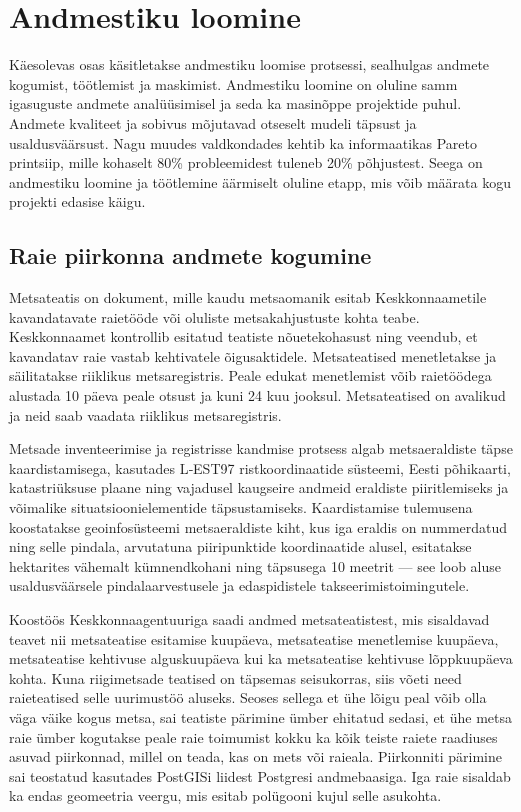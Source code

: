 \section{Andmestiku loomine}
Käesolevas osas käsitletakse andmestiku loomise protsessi, sealhulgas andmete kogumist, töötlemist ja maskimist. Andmestiku loomine on oluline samm igasuguste andmete analüüsimisel ja seda ka masinõppe projektide puhul. Andmete kvaliteet ja sobivus mõjutavad otseselt mudeli täpsust ja usaldusväärsust. Nagu muudes valdkondades kehtib ka informaatikas Pareto printsiip, mille kohaselt 80\% probleemidest tuleneb 20\% põhjustest. Seega on andmestiku loomine ja töötlemine äärmiselt oluline etapp, mis võib määrata kogu projekti edasise käigu.

\subsection{Raie piirkonna andmete kogumine}
Metsateatis on dokument, mille kaudu metsaomanik esitab Keskkonnaametile
kavandatavate raietööde või oluliste metsakahjustuste kohta teabe. Keskkonnaamet
kontrollib esitatud teatiste nõuetekohasust ning veendub, et kavandatav raie
vastab kehtivatele õigusaktidele. Metsateatised menetletakse ja säilitatakse
riiklikus metsaregistris. Peale edukat menetlemist võib raietöödega alustada 10 päeva peale otsust ja kuni 24 kuu jooksul. \cite{MetsateatisJaMetsaregister} Metsateatised on avalikud ja neid saab vaadata riiklikus metsaregistris.

Metsade inventeerimise ja registrisse kandmise protsess algab metsaeraldiste
täpse kaardistamisega, kasutades L‑EST97 ristkoordinaatide süsteemi, Eesti
põhikaarti, katastriüksuse plaane ning vajadusel kaugseire andmeid eraldiste
piiritlemiseks ja võimalike situatsioonielementide täpsustamiseks. Kaardistamise
tulemusena koostatakse geoinfosüsteemi metsaeraldiste kiht, kus iga eraldis on
nummerdatud ning selle pindala, arvutatuna piiripunktide koordinaatide alusel, 
esitatakse hektarites vähemalt kümnendkohani ning täpsusega 10 meetrit --- see
loob aluse usaldusväärsele pindalaarvestusele ja edaspidistele
takseerimistoimingutele. \cite{MetsaKorraldamiseJuhend}

Koostöös Keskkonnaagentuuriga saadi andmed metsateatistest, mis sisaldavad teavet nii metsateatise esitamise kuupäeva, metsateatise menetlemise kuupäeva, metsateatise kehtivuse alguskuupäeva kui ka metsateatise kehtivuse lõppkuupäeva kohta. Kuna riigimetsade teatised on täpsemas seisukorras, siis võeti need raieteatised selle uurimustöö aluseks. Seoses sellega et ühe lõigu peal võib olla väga väike kogus metsa, sai teatiste pärimine ümber ehitatud sedasi, et ühe metsa raie ümber kogutakse peale raie toimumist kokku ka kõik teiste raiete raadiuses asuvad piirkonnad, millel on teada, kas on mets või raieala. Piirkonniti pärimine sai teostatud kasutades PostGISi liidest Postgresi andmebaasiga. Iga raie sisaldab ka endas geomeetria veergu, mis esitab polügooni kujul selle asukohta. 

